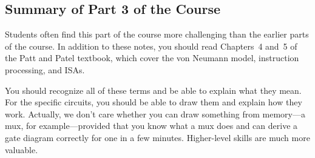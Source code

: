 \classtitle

\subsection{Summary of Part 3 of the Course}



Students often find this part of the course more challenging than the
earlier parts of the course.
%
In addition to these notes, you should read Chapters~4 and~5 of the 
Patt and Patel textbook, which cover the von Neumann
model, instruction processing, and ISAs.  



You should recognize all of these terms and be able
to explain what they mean.  For the specific circuits, you should be able 
to draw them and explain how they work.  Actually, we don't care whether 
you can draw something from memory---a mux, for example---provided that 
you know what a mux does and can derive a gate diagram correctly for one 
in a few minutes.  Higher-level skills are much more valuable.


